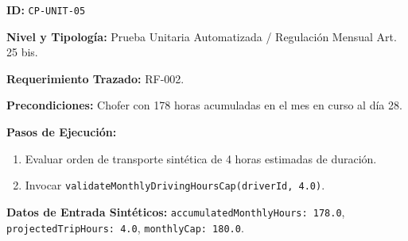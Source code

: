 \par\noindent\textbf{ID:} \texttt{C\allowbreak{}P\allowbreak{}-\allowbreak{}U\allowbreak{}N\allowbreak{}I\allowbreak{}T\allowbreak{}-\allowbreak{}0\allowbreak{}5\allowbreak{}}\par
\par\noindent\textbf{Nivel y Tipología:} Prueba Unitaria Automatizada / Regulación Mensual Art. 25 bis.\par
\par\noindent\textbf{Requerimiento Trazado:} RF-002.\par
\par\noindent\textbf{Precondiciones:} Chofer con 178 horas acumuladas en el mes en curso al día 28.\par
\par\noindent\textbf{Pasos de Ejecución:} \par
\begin{enumerate}
\item Evaluar orden de transporte sintética de 4 horas estimadas de duración.
\item Invocar \texttt{v\allowbreak{}a\allowbreak{}l\allowbreak{}i\allowbreak{}d\allowbreak{}a\allowbreak{}t\allowbreak{}e\allowbreak{}M\allowbreak{}o\allowbreak{}n\allowbreak{}t\allowbreak{}h\allowbreak{}l\allowbreak{}y\allowbreak{}D\allowbreak{}r\allowbreak{}i\allowbreak{}v\allowbreak{}i\allowbreak{}n\allowbreak{}g\allowbreak{}H\allowbreak{}o\allowbreak{}u\allowbreak{}r\allowbreak{}s\allowbreak{}C\allowbreak{}a\allowbreak{}p\allowbreak{}(\allowbreak{}d\allowbreak{}r\allowbreak{}i\allowbreak{}v\allowbreak{}e\allowbreak{}r\allowbreak{}I\allowbreak{}d\allowbreak{},\allowbreak{} 4\allowbreak{}.\allowbreak{}0\allowbreak{})\allowbreak{}}.
\end{enumerate}
\par\noindent\textbf{Datos de Entrada Sintéticos:} \texttt{a\allowbreak{}c\allowbreak{}c\allowbreak{}u\allowbreak{}m\allowbreak{}u\allowbreak{}l\allowbreak{}a\allowbreak{}t\allowbreak{}e\allowbreak{}d\allowbreak{}M\allowbreak{}o\allowbreak{}n\allowbreak{}t\allowbreak{}h\allowbreak{}l\allowbreak{}y\allowbreak{}H\allowbreak{}o\allowbreak{}u\allowbreak{}r\allowbreak{}s\allowbreak{}:\allowbreak{} 1\allowbreak{}7\allowbreak{}8\allowbreak{}.\allowbreak{}0\allowbreak{}}, \texttt{p\allowbreak{}r\allowbreak{}o\allowbreak{}j\allowbreak{}e\allowbreak{}c\allowbreak{}t\allowbreak{}e\allowbreak{}d\allowbreak{}T\allowbreak{}r\allowbreak{}i\allowbreak{}p\allowbreak{}H\allowbreak{}o\allowbreak{}u\allowbreak{}r\allowbreak{}s\allowbreak{}:\allowbreak{} 4\allowbreak{}.\allowbreak{}0\allowbreak{}}, \texttt{m\allowbreak{}o\allowbreak{}n\allowbreak{}t\allowbreak{}h\allowbreak{}l\allowbreak{}y\allowbreak{}C\allowbreak{}a\allowbreak{}p\allowbreak{}:\allowbreak{} 1\allowbreak{}8\allowbreak{}0\allowbreak{}.\allowbreak{}0\allowbreak{}}.\par
